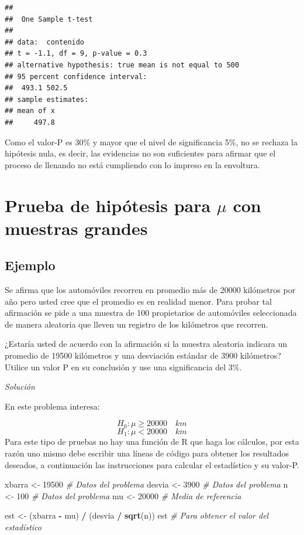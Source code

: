 \documentclass[10pt,]{krantz}
\makeatletter
\newenvironment{Shaded}{\begin{snugshade}}{\end{snugshade}}
\newcommand{\KeywordTok}[1]{\textcolor[rgb]{0.13,0.29,0.53}{\textbf{#1}}}
\newcommand{\DecValTok}[1]{\textcolor[rgb]{0.00,0.00,0.81}{#1}}
\newcommand{\StringTok}[1]{\textcolor[rgb]{0.31,0.60,0.02}{#1}}
\newcommand{\CommentTok}[1]{\textcolor[rgb]{0.56,0.35,0.01}{\textit{#1}}}
\newcommand{\OperatorTok}[1]{\textcolor[rgb]{0.81,0.36,0.00}{\textbf{#1}}}
\newcommand{\NormalTok}[1]{#1}
\newenvironment{kframe}{%
\medskip{}
\setlength{\fboxsep}{.8em}
 \def\at@end@of@kframe{}%
 \ifinner\ifhmode%
  \def\at@end@of@kframe{\end{minipage}}%
  \begin{minipage}{\columnwidth}%
 \fi\fi%
 \def\FrameCommand##1{\hskip\@totalleftmargin \hskip-\fboxsep
 \colorbox{shadecolor}{##1}\hskip-\fboxsep
     \hskip-\linewidth \hskip-\@totalleftmargin \hskip\columnwidth}%
 \MakeFramed {\advance\hsize-\width
   \@totalleftmargin\z@ \linewidth\hsize
   \@setminipage}}%
 {\par\unskip\endMakeFramed%
 \at@end@of@kframe}
\renewenvironment{Shaded}{\begin{kframe}}{\end{kframe}}
\makeatother
\begin{document}
\begin{verbatim}
## 
##  One Sample t-test
## 
## data:  contenido
## t = -1.1, df = 9, p-value = 0.3
## alternative hypothesis: true mean is not equal to 500
## 95 percent confidence interval:
##  493.1 502.5
## sample estimates:
## mean of x 
##     497.8
\end{verbatim}

Como el valor-P es 30\% y mayor que el nivel de significancia 5\%, no se
rechaza la hipótesis nula, es decir, las evidencias no son suficientes
para afirmar que el proceso de llenando no está cumpliendo con lo
impreso en la envoltura.

\section{\texorpdfstring{Prueba de hipótesis para \(\mu\) con muestras
grandes}{Prueba de hipótesis para \textbackslash{}mu con muestras grandes}}\label{prueba-de-hipotesis-para-mu-con-muestras-grandes}

\subsection*{Ejemplo}\label{ejemplo-64}


Se afirma que los automóviles recorren en promedio más de 20000
kilómetros por año pero usted cree que el promedio es en realidad menor.
Para probar tal afirmación se pide a una muestra de 100 propietarios de
automóviles seleccionada de manera aleatoria que lleven un registro de
los kilómetros que recorren.

¿Estaría usted de acuerdo con la afirmación si la muestra aleatoria
indicara un promedio de 19500 kilómetros y una desviación estándar de
3900 kilómetros? Utilice un valor P en su conclusión y use una
significancia del 3\%.

\emph{Solución}

En este problema interesa:

\[H_0: \mu \ge 20000 \quad km\] \[H_1: \mu < 20000 \quad km\] Para este
tipo de pruebas no hay una función de R que haga los cálculos, por esta
razón uno mismo debe escribir una líneas de código para obtener los
resultados deseados, a continuación las instrucciones para calcular el
estadístico y su valor-P.

\begin{Shaded}
\begin{Highlighting}[]
\NormalTok{xbarra <-}\StringTok{ }\DecValTok{19500}  \CommentTok{# Datos del problema}
\NormalTok{desvia <-}\StringTok{ }\DecValTok{3900}   \CommentTok{# Datos del problema}
\NormalTok{n <-}\StringTok{ }\DecValTok{100}         \CommentTok{# Datos del problema}
\NormalTok{mu <-}\StringTok{ }\DecValTok{20000}      \CommentTok{# Media de referencia}

\NormalTok{est <-}\StringTok{ }\NormalTok{(xbarra }\OperatorTok{-}\StringTok{ }\NormalTok{mu) }\OperatorTok{/}\StringTok{ }\NormalTok{(desvia }\OperatorTok{/}\StringTok{ }\KeywordTok{sqrt}\NormalTok{(n))}
\NormalTok{est  }\CommentTok{# Para obtener el valor del estadístico}
\end{Highlighting}
\end{Shaded}
\end{document}
